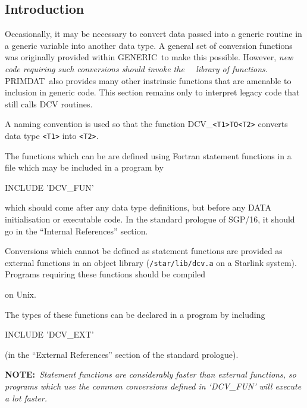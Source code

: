 \documentclass[twoside,11pt,nolof]{starlink}
\providecommand{\GENERIC}{{\footnotesize GENERIC}\normalsize}
\providecommand{\PRIMDAT}{{\footnotesize PRIMDAT}\normalsize}
\providecommand{\PRIMDATref}{\xref{\PRIMDAT}{sun39}{}~}
\begin{document}
\subsection{Introduction}

Occasionally, it may be necessary to convert data passed into a
generic routine in a generic variable into another data type. A
general set of conversion functions was originally provided within
\GENERIC\ to make this possible.  However, \emph{new code requiring such
conversions should invoke the \PRIMDATref\ library of functions}.
\PRIMDAT\ also provides many other instrinsic functions that are
amenable to inclusion in generic code.  This section remains
only to interpret legacy code that still calls DCV routines.

A naming convention is used so that the function
DCV\_\verb+<T1>TO<T2>+ converts data type \verb+<T1>+ into \verb+<T2>+.

The functions which can be are defined using Fortran statement
functions in a file which may be included in a program by

\begin{terminalv}
INCLUDE 'DCV_FUN'
\end{terminalv}

which should come after any data type definitions, but before
any DATA initialisation or executable code.
In the standard prologue of SGP/16, it should go in the
``Internal References'' section.

Conversions which cannot be defined as statement functions are
provided as external functions in an object library (\texttt{/star/lib/dcv.a} on a Starlink system).  Programs requiring these
functions should be compiled

\begin{terminalv}
\end{terminalv}

on Unix.

The types of these functions can be declared in a program by including

\begin{terminalv}
INCLUDE 'DCV_EXT'
\end{terminalv}

(in the ``External References'' section of the standard prologue).

\textbf{NOTE:}~\emph{Statement functions are considerably faster than external
functions, so programs which use the common conversions defined in `DCV\_FUN'
will execute a lot faster.}
\end{document}
